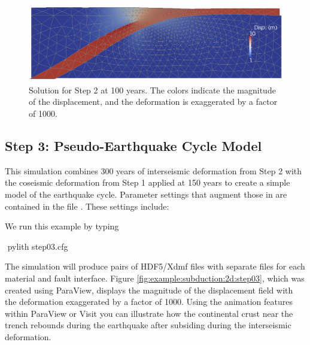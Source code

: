\begin{figure}
  \includegraphics[width=4.5in]{examples/figs/subduction2d_step02_soln}
  \caption{Solution for Step 2 at 100 years. The colors indicate the
    magnitude of the displacement, and the deformation is exaggerated
    by a factor of 1000.}
  \label{fig:example:subduction:2d:step02}
\end{figure}


\subsection{Step 3: Pseudo-Earthquake Cycle Model}

This simulation combines 300 years of interseismic deformation from
Step 2 with the coseismic deformation from Step 1 applied at 150 years
to create a simple model of the earthquake cycle. Parameter settings
that augment those in  are contained in the
file . These settings include:
\begin{inventory}
\end{inventory}
We run this example by typing
\begin{shell}
$$ pylith step03.cfg
\end{shell}
The simulation will produce pairs of HDF5/Xdmf files with separate
files for each material and fault interface. Figure \vref{fig:example:subduction:2d:step03},
which was created using ParaView, displays the magnitude of the displacement
field with the deformation exaggerated by a factor of 1000. Using
the animation features within ParaView or Visit you can illustrate
how the continental crust near the trench rebounds during the earthquake
after subsiding during the interseismic deformation. 

